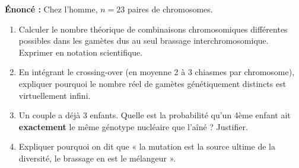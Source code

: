 \documentclass[11pt]{article}
\begin{document}
\begin{exoresolu}
    \textbf{Énoncé :} Chez l'homme, $n = 23$ paires de chromosomes.
    \begin{enumerate}
        \item Calculer le nombre théorique de combinaisons chromosomiques différentes possibles dans les gamètes dus au seul brassage interchromosomique. Exprimer en notation scientifique.
        \item En intégrant le crossing-over (en moyenne 2 à 3 chiasmes par chromosome), expliquer pourquoi le nombre réel de gamètes génétiquement distincts est virtuellement infini.
        \item Un couple a déjà 3 enfants. Quelle est la probabilité qu'un 4ème enfant ait \textbf{exactement} le même génotype nucléaire que l'aîné ? Justifier.
        \item Expliquer pourquoi on dit que « la mutation est la source ultime de la diversité, le brassage en est le mélangeur ».
    \end{enumerate}


\end{exoresolu}
\end{document}
